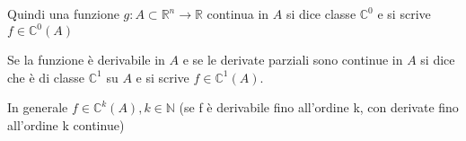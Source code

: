 \documentclass[11pt]{article}
\begin{document}
Quindi una funzione $g: A \subset \mathbb{R}^{n} \rightarrow \mathbb{R}$ continua in $A$ si dice classe $\mathbb{C}^{0}$ e si scrive $f \in \mathbb{C}^{0}(A)$


Se la funzione è derivabile in $A$ e se le derivate parziali sono continue in $A$ si dice che è di classe $\mathbb{C}^{1}$ su $A$ e si scrive $f \in \mathbb{C}^{1}(A)$.


In generale $f \in \mathbb{C}^{k}(A), k \in \mathbb{N}$ (se f è derivabile fino all'ordine k, con derivate fino all'ordine k continue)
\end{document}
